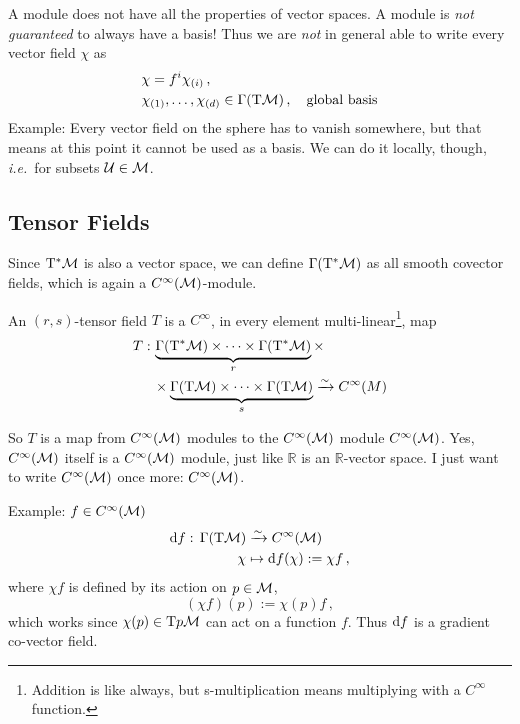 \documentclass[11pt, a4paper, twocolumn]{article} %
\begin{document}
\begin{center}
\end{center}
A module does not have all the properties of vector spaces.
A module is \textit{not guaranteed} to always have a basis!
Thus we are \textit{not} in general able to write every vector field $\chi$ as
\begin{align}
    &\chi = f^i \chi_{(i)}\,,\\
    &\chi_{(1)}, \ldots, \chi_{(d)} \in \Gamma(\T\M)\,,\quad\text{global basis}
\end{align}
Example: Every vector field on the sphere has to vanish somewhere, 
but that means at this point it cannot be used as a basis.
We can do it locally, though, \textit{i.e.}\ for subsets $\mathcal{U} \in \mathcal{M}$.

\subsection{Tensor Fields}
Since $\T^*\M$ is also a vector space, we can define $\Gamma(\T^*\M)$ as all smooth
covector fields, which is again a $C^\infty(\mathcal{M})$-module.
\begin{defn}
    An $(r,s)$-tensor field $T$ is a $C^\infty$, in every element  multi-linear\footnote{Addition is like always,
    but s-multiplication means multiplying with a $C^\infty$ function.}, map
    \begin{align}
        T:\, & \underbrace{\Gamma(\T^*\M) \times \cdots \times \Gamma(\T^*\M)}_r \times\nonumber\\
        & \times \underbrace{\Gamma(\T\M) \times \cdots \times \Gamma(\T\M)}_s \linearto C^\infty(M)
    \end{align}
\end{defn}
\begin{note}
    So $T$ is a map from $C^\infty(\mathcal{M})$ modules to the $C^\infty(\mathcal{M})$ module $C^\infty(\mathcal{M})$.
    Yes, $C^\infty(\mathcal{M})$ itself is a $C^\infty(\mathcal{M})$ module, just like $\mathbb{R}$ is an
    $\mathbb{R}$-vector space.
    I just want to write $C^\infty(\mathcal{M})$ once more: $C^\infty(\mathcal{M})$.
\end{note}

Example: $f \in C^\infty(\mathcal{M})$
\begin{align}
    \diff f:\,\Gamma(\T\M)&\linearto C^\infty(\M)\\
    \chi &\mapsto \diff f(\chi):= \chi f\,,
\end{align}
where $\chi f$ is defined by its action on $p\in\mathcal{M}$,
\begin{equation}
    (\chi f)(p) := \chi(p) f\,,
\end{equation}
which works since $\chi(p)\in\T{p}\M$ can act on a function $f$.
Thus $\operatorname{d\!} f$ is a gradient co-vector field.
\end{document}
